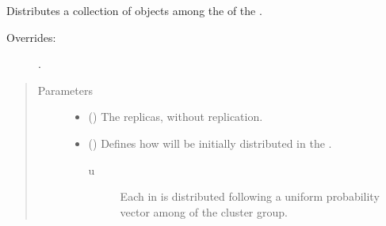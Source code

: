\documentclass[letterpaper,10pt,english]{sphinxmanual}
\begin{document}
\begin{fulllineitems}
\begin{fulllineitems}
\begin{quote}
\begin{description}
\end{description}\end{quote}

\end{fulllineitems}


\begin{fulllineitems}
\label{\detokenize{app.domain:app.domain.cluster_groups.SGCluster.spread_files}}
Distributes a collection of
{\hyperref[\detokenize{app.domain.helpers:app.domain.helpers.smart_dataclasses.FileBlockData}]{}}
objects among the {\hyperref[\detokenize{app.domain:app.domain.cluster_groups.Cluster.members}]{}} of the .
\begin{description}
\item[{Overrides:}] \leavevmode
{\hyperref[\detokenize{app.domain:app.domain.cluster_groups.Cluster.spread_files}]{}}.

\end{description}
\begin{quote}\begin{description}
\item[{Parameters}] \leavevmode\begin{itemize}
\item {} 
 ({\hyperref[\detokenize{app:app.type_hints.ReplicasDict}]{}}) \textendash{} The {\hyperref[\detokenize{app.domain.helpers:app.domain.helpers.smart_dataclasses.FileBlockData}]{}}
replicas, without replication.

\item {} 
 () \textendash{} 
Defines how  will be initially distributed in
the .
\begin{description}
\item[{u}] \leavevmode
Each {\hyperref[\detokenize{app.domain.helpers:app.domain.helpers.smart_dataclasses.FileBlockData}]{}} in
 is distributed following a
uniform probability vector among  of
the cluster group.


\end{description}
\end{itemize}
\end{description}
\end{quote}
\end{fulllineitems}
\end{fulllineitems}
\end{document}
